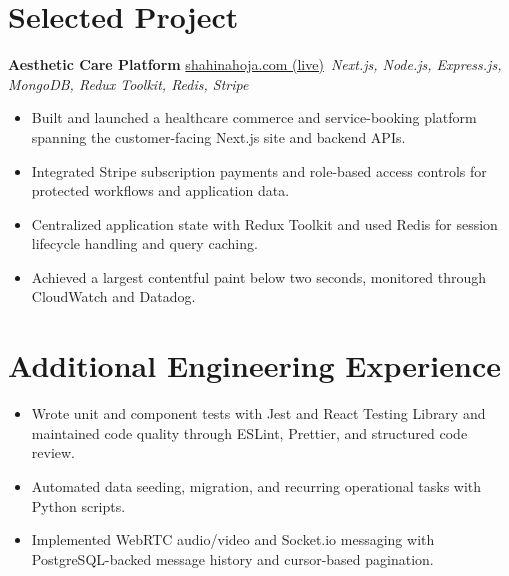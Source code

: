 \documentclass[11pt,a4paper,sans]{moderncv}
\begin{document}
\vspace{3pt}


\section{Selected Project}
\vspace{1pt}
\textbf{Aesthetic Care Platform} \hfill \href{https://shahinahoja.com/}{shahinahoja.com (live)}\
\textit{Next.js, Node.js, Express.js, MongoDB, Redux Toolkit, Redis, Stripe}
\begin{itemize}
\item {Built and launched a healthcare commerce and service-booking platform spanning the customer-facing Next.js site and backend APIs.}
\item {Integrated Stripe subscription payments and role-based access controls for protected workflows and application data.}
\item {Centralized application state with Redux Toolkit and used Redis for session lifecycle handling and query caching.}
\item {Achieved a largest contentful paint below two seconds, monitored through CloudWatch and Datadog.}
\end{itemize}

\section{Additional Engineering Experience}
\vspace{1pt}
\begin{itemize}
    \item {Wrote unit and component tests with Jest and React Testing Library and maintained code quality through ESLint, Prettier, and structured code review.}
    \item {Automated data seeding, migration, and recurring operational tasks with Python scripts.}
    \item {Implemented WebRTC audio/video and Socket.io messaging with PostgreSQL-backed message history and cursor-based pagination.}
\end{itemize}
\end{document}
